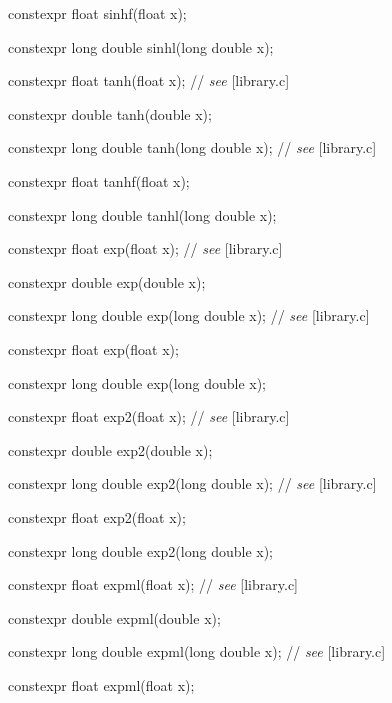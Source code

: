 \documentclass[prd,twocolumn,amsmath,amssymb,nofootinbib,eqsecnum]{revtex4-1}
\newcommand{\highlight}[1]{{\color{red} #1}}
\newcommand{\stdcomment}[1]{{// {\em see} [#1]}}
\begin{document}
{\highlight{constexpr} float sinhf(float x);

\highlight{constexpr} long double sinhl(long double x);

\vspace{2ex}


\highlight{constexpr} float tanh(float x); \stdcomment{library.c}

\highlight{constexpr} double tanh(double x);

\highlight{constexpr} long double tanh(long double x); \stdcomment{library.c}

\highlight{constexpr} float tanhf(float x);

\highlight{constexpr} long double tanhl(long double x);

\vspace{2ex}


\highlight{constexpr} float exp(float x); \stdcomment{library.c}

\highlight{constexpr} double exp(double x);

\highlight{constexpr} long double exp(long double x); \stdcomment{library.c}

\highlight{constexpr} float exp(float x);

\highlight{constexpr} long double exp(long double x);

\vspace{2ex}


\highlight{constexpr} float exp2(float x); \stdcomment{library.c}

\highlight{constexpr} double exp2(double x);

\highlight{constexpr} long double exp2(long double x); \stdcomment{library.c}

\highlight{constexpr} float exp2(float x);

\highlight{constexpr} long double exp2(long double x);

\vspace{2ex}


\highlight{constexpr} float expml(float x); \stdcomment{library.c}

\highlight{constexpr} double expml(double x);

\highlight{constexpr} long double expml(long double x); \stdcomment{library.c}

\highlight{constexpr} float expml(float x);

}
\end{document}
